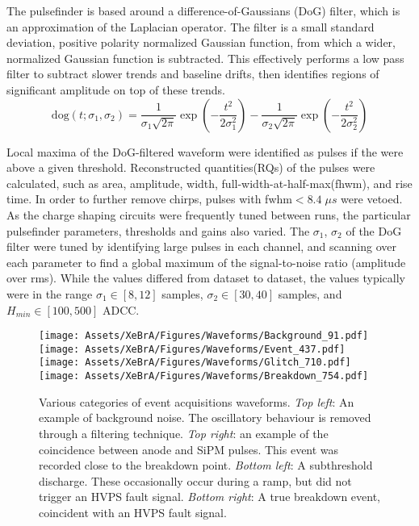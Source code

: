 The pulsefinder is based around a difference-of-Gaussians (DoG) filter, which is an approximation of the Laplacian operator.
The filter is a small standard deviation, positive polarity normalized Gaussian function, from which a wider, normalized Gaussian function is subtracted.
This effectively performs a low pass filter to subtract slower trends and baseline drifts, then identifies regions of significant amplitude on top of these trends.
\begin{equation}
    \text{dog}(t;\sigma_1,\sigma_2) = \frac{1}{\sigma_1 \sqrt{2 \pi }} \exp(-\frac{t^2}{2\sigma_1^2}) -\frac{1}{\sigma_2 \sqrt{2 \pi }} \exp(-\frac{t^2}{2\sigma_2^2})
\end{equation}

Local maxima of the DoG-filtered waveform were identified as pulses if the were above a given threshold.
Reconstructed quantities(RQs) of the pulses were calculated, such as area, amplitude, width, full-width-at-half-max(fhwm), and rise time.
In order to further remove chirps, pulses with fwhm$<8.4\;\mu s$ were vetoed.
As the charge shaping circuits were frequently tuned between runs, the particular pulsefinder parameters, thresholds and gains also varied.
The $\sigma_1$, $\sigma_2$ of the DoG filter were tuned by identifying large pulses in each channel, and scanning over each parameter to find a global maximum of the signal-to-noise ratio (amplitude over rms).
While the values differed from dataset to dataset, the values typically were in the range $\sigma_1\in[8,12]$ samples, $\sigma_2 \in [30,40]$ samples, and $H_{min} \in [100,500]$ ADCC.

\begin{figure}
\centering
 \texttt{[image: Assets/XeBrA/Figures/Waveforms/Background\_91.pdf]}\qquad
\texttt{[image: Assets/XeBrA/Figures/Waveforms/Event\_437.pdf]} \qquad
\texttt{[image: Assets/XeBrA/Figures/Waveforms/Glitch\_710.pdf]}\qquad
\texttt{[image: Assets/XeBrA/Figures/Waveforms/Breakdown\_754.pdf]}

 \caption[Various categories of event acquisitions waveforms in XeBrA.]%
 {Various categories of event acquisitions waveforms.
  \textit{Top left}: An example of background noise. 
The oscillatory behaviour is removed through a filtering technique.
 \textit{Top right}: an example of the coincidence between anode and SiPM pulses. This event was recorded close to the breakdown point.
 \textit{Bottom left}: A subthreshold discharge. These occasionally occur during a ramp, but did not trigger an HVPS fault signal.
 \textit{Bottom right}: A true breakdown event, coincident with an HVPS fault signal.
    }
    \label{fig:Waveforms}
\end{figure}

